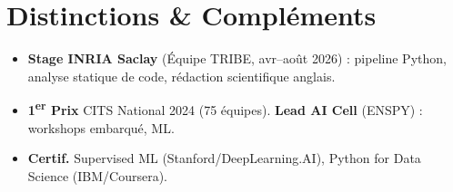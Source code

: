 \documentclass[a4paper,11pt]{article}
\begin{document}
\section{Distinctions \& Compléments}
\begin{itemize}[leftmargin=*, label=\tiny$\bullet$, nosep]
    \item \small{\textbf{Stage INRIA Saclay} (Équipe TRIBE, avr--août 2026) : pipeline Python, analyse statique de code, rédaction scientifique anglais.}
    \item \small{\textbf{1\textsuperscript{er} Prix} CITS National 2024 (75 équipes). \textbf{Lead AI Cell} (ENSPY) : workshops embarqué, ML.}
    \item \small{\textbf{Certif.} Supervised ML (Stanford/DeepLearning.AI), Python for Data Science (IBM/Coursera).}
\end{itemize}
\end{document}
